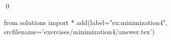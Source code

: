 
\begin{ex} 
  \label{ex:minimization4}
  
  \qed
\end{ex} 
\begin{python0}
from solutions import *
add(label="ex:minimization4",
    srcfilename='exercises/minimization4/answer.tex') 
\end{python0}
